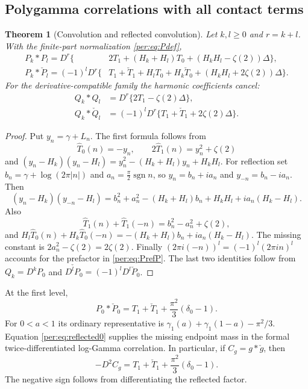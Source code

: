 \documentclass[11pt,letterpaper]{article}
\numberwithin{equation}{section}
\theoremstyle{plain}
\newtheorem{theorem}{Theorem}[section]
\theoremstyle{definition}
\theoremstyle{remark}
\begin{document}
\subsection{Polygamma correlations with all contact terms}

\begin{theorem}[Convolution and reflected convolution]
\label{per:thm:polycorr}
Let $k,l\ge0$ and $r=k+l$. With the finite-part normalization
\eqref{per:eq:Pdef},
\begin{align}
 P_k*P_l=D^r\bigl\{&2T_1+(H_k+H_l)T_0
                         +(H_kH_l-\zeta(2))\Delta\bigr\},
 \label{per:eq:PP}\\
 P_k*\check P_l=(-1)^lD^r\bigl\{&T_1+\check T_1
                   +H_lT_0+H_k\check T_0
                   +(H_kH_l+2\zeta(2))\Delta\bigr\}.
 \label{per:eq:PrefP}
\end{align}
For the derivative-compatible family the harmonic coefficients cancel:
\begin{align}
 Q_k*Q_l&=D^r\{2T_1-\zeta(2)\Delta\},
 \label{per:eq:QQ}\\
 Q_k*\check Q_l&=(-1)^lD^r
              \{T_1+\check T_1+2\zeta(2)\Delta\}.
 \label{per:eq:QrefQ}
\end{align}
\end{theorem}

\begin{proof}
Put $y_n=\gamma+L_n$. The first formula follows from
\[
 \widehat T_0(n)=-y_n,\qquad
 2\widehat T_1(n)=y_n^2+\zeta(2)
\]
and $(y_n-H_k)(y_n-H_l)=y_n^2-(H_k+H_l)y_n+H_kH_l$.
For reflection set $b_n=\gamma+\log(2\pi|n|)$ and
$a_n=\frac\pi2\operatorname{sgn}n$, so $y_n=b_n+ia_n$ and
$y_{-n}=b_n-ia_n$. Then
\[
 (y_n-H_k)(y_{-n}-H_l)
 =b_n^2+a_n^2-(H_k+H_l)b_n+H_kH_l
                                      +ia_n(H_k-H_l).
\]
Also
\[
 \widehat T_1(n)+\widehat T_1(-n)=b_n^2-a_n^2+\zeta(2),
\]
and
$H_l\widehat T_0(n)+H_k\widehat T_0(-n)
=-(H_k+H_l)b_n+ia_n(H_k-H_l)$.
The missing constant is $2a_n^2-\zeta(2)=2\zeta(2)$.
Finally $(2\pi i(-n))^l=(-1)^l(2\pi in)^l$ accounts for the
prefactor in \eqref{per:eq:PrefP}. The last two identities follow
from $Q_k=D^kP_0$ and $\check{D^lP_0}=(-1)^lD^l\check P_0$.
\end{proof}

At the first level,
\begin{equation}\label{per:eq:reflected0}
 P_0*\check P_0=T_1+\check T_1+
                         \frac{\pi^2}{3}(\delta_0-1).
\end{equation}
For $0<a<1$ its ordinary representative is
$\gamma_1(a)+\gamma_1(1-a)-\pi^2/3$. Equation
\eqref{per:eq:reflected0} supplies the missing endpoint mass in the
formal twice-differentiated log-Gamma correlation. In particular, if
$C_g=g*\check g$, then
\begin{equation}\label{per:eq:Cg}
 -D^2C_g=T_1+\check T_1+\frac{\pi^2}{3}(\delta_0-1).
\end{equation}
The negative sign follows from differentiating the reflected factor.
\end{document}
